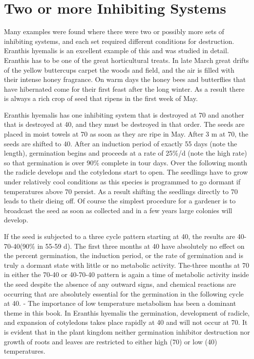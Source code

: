 \chapter{Two or more Inhibiting Systems}

Many examples were found where there were two or possibly more sets of
inhibiting systems, and each set required different conditions for destruction. Eranthis
hyemalis is an excellent example of this and was studied in detail. Eranthis has to be
one of the great horticultural treats. In late March great drifts of the yellow buttercups
carpet the woods and field, and the air is filled with their intense honey fragrance. On
warm days the honey bees and butterflies that have hibernated come for their first
feast after the long winter. As a result there is always a rich crop of seed that ripens in
the first week of May.

Eranthis hyemalis has one inhibiting system that is destroyed at 70 and another
that is destroyed at 40, and they must be destroyed in that order. The seeds are placed
in moist towels at 70 as soon as they are ripe in May. After 3 m at 70, the seeds are
shifted to 40. After an induction period of exactly 55 days (note the length),
germination begins and proceeds at a rate of 25\%/d (note the high rate) so that
germination is over 90\% complete in tour days. Over the following month the radicle
develops and the cotyledons start to open. The seedlings have to grow under
relatively cool conditions as this species is programmed to go dormant if temperatures
above 70 persist. As a result shifting the seedlings directly to 70 leads to their dieing
off. Of course the simplest procedure for a gardener is to broadcast the seed as soon
as collected and in a few years large colonies will develop.

If the seed is subjected to a three cycle pattern starting at 40, the results are 40-
70-40(90\% in 55-59 d). The first three months at 40 have absolutely no effect on the
percent germination, the induction period, or the rate of germination and is truly a
dormant state with little or no metabolic activity. The-three months at 70 in either the
70-40 or 40-70-40 pattern is again a time of metabolic activity inside the seed despite
the absence of any outward signs, and chemical reactions are occurring that are
absolutely essential for the germination in the following cycle at 40. -
The importance of low temperature metabolism has been a dominant theme in
this book. In Eranthis hyemalis the germination, development of radicle, and
expansion of cotyledons takes place rapidly at 40 and will not occur at 70. It is evident
that in the plant kingdom neither germination inhibitor destruction nor growth of roots
and leaves are restricted to either high (70) or low (40) temperatures.


